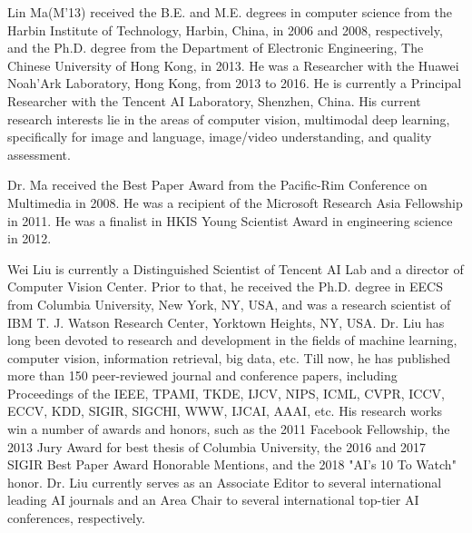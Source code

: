 \documentclass[journal]{IEEEtran}
\begin{document}
\begin{IEEEbiography}{Lin Ma}(M’13) 
received the B.E. and M.E. degrees in computer science from the Harbin Institute of Technology, Harbin, China, in 2006 and 2008, respectively, and the Ph.D. degree from the Department of Electronic Engineering, The Chinese University of Hong Kong, in 2013. He was a Researcher with the Huawei Noah’Ark Laboratory, Hong Kong, from 2013 to 2016. He is currently a Principal Researcher with the Tencent AI Laboratory, Shenzhen, China. His current research interests lie in the areas of computer vision, multimodal deep learning, specifically for image and language, image/video understanding, and quality assessment. 

Dr. Ma received the Best Paper Award from the Pacific-Rim Conference on Multimedia in 2008. He was a recipient of the Microsoft Research Asia Fellowship in 2011. He was a finalist in HKIS Young Scientist Award in engineering science in 2012.


\end{IEEEbiography}

\begin{IEEEbiography}{Wei Liu}
is currently a Distinguished Scientist of Tencent AI Lab and a director of Computer Vision Center. Prior to that, he received the Ph.D. degree in EECS from Columbia University, New York, NY, USA, and was a research scientist of IBM T. J. Watson Research Center, Yorktown Heights, NY, USA. Dr. Liu has long been devoted to research and development in the fields of machine learning, computer vision, information retrieval, big data, etc. Till now, he has published more than 150 peer-reviewed journal and conference papers, including Proceedings of the IEEE, TPAMI, TKDE, IJCV, NIPS, ICML, CVPR, ICCV, ECCV, KDD, SIGIR, SIGCHI, WWW, IJCAI, AAAI, etc. His research works win a number of awards and honors, such as the 2011 Facebook Fellowship, the 2013 Jury Award for best thesis of Columbia University, the 2016 and 2017 SIGIR Best Paper Award Honorable Mentions, and the 2018 "AI's 10 To Watch" honor. Dr. Liu currently serves as an Associate Editor to several international leading AI journals and an Area Chair to several international top-tier AI conferences, respectively.

\end{IEEEbiography}
\end{document}
